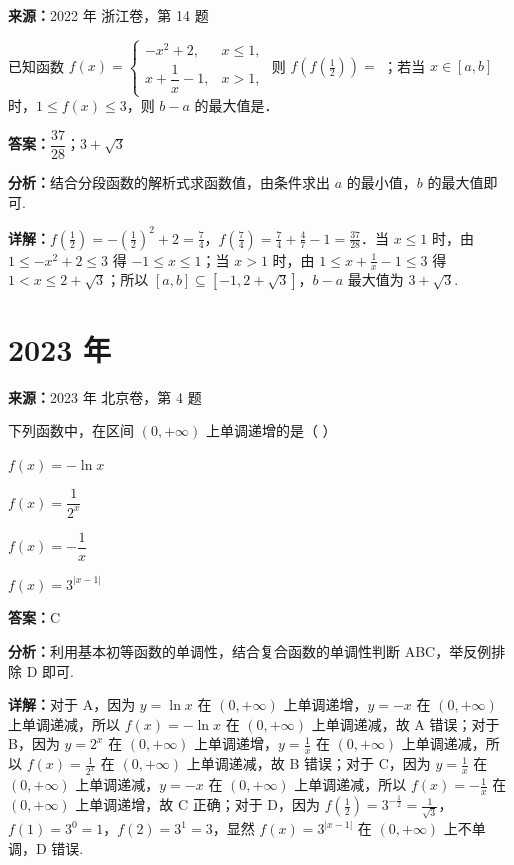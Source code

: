 \begin{question}[points=6]
\textbf{来源：}2022 年 浙江卷，第 14 题\par
已知函数 $f(x) = \begin{cases} -x^2+2, & x \le 1, \\ x+\dfrac{1}{x}-1, & x > 1, \end{cases}$ 则 $f\left(f\left(\frac{1}{2}\right)\right) =$ ；若当 $x \in [a,b]$ 时，$1 \le f(x) \le 3$，则 $b-a$ 的最大值是．
\begin{solution}
\textbf{答案：}$\dfrac{37}{28}$；$3+\sqrt{3}$

\textbf{分析：}结合分段函数的解析式求函数值，由条件求出 $a$ 的最小值，$b$ 的最大值即可.

\textbf{详解：}$f(\frac{1}{2}) = -(\frac{1}{2})^2+2 = \frac{7}{4}$，$f(\frac{7}{4}) = \frac{7}{4}+\frac{4}{7}-1 = \frac{37}{28}$．当 $x\le1$ 时，由 $1\le -x^2+2 \le 3$ 得 $-1\le x\le1$；当 $x>1$ 时，由 $1\le x+\frac{1}{x}-1\le 3$ 得 $1<x\le 2+\sqrt{3}$；所以 $[a,b]\subseteq[-1,2+\sqrt{3}]$，$b-a$ 最大值为 $3+\sqrt{3}$.
\end{solution}
\end{question}

\section*{2023 年}

\begin{question}[points=4]
\textbf{来源：}2023 年 北京卷，第 4 题\par
下列函数中，在区间 $(0, +\infty)$ 上单调递增的是（ ）
\begin{choices}
  \item $f(x) = -\ln x$
  \item $f(x) = \dfrac{1}{2^x}$
  \item $f(x) = -\dfrac{1}{x}$
  \item $f(x) = 3^{|x-1|}$
\end{choices}
\begin{solution}
\textbf{答案：}C

\textbf{分析：}利用基本初等函数的单调性，结合复合函数的单调性判断 ABC，举反例排除 D 即可.

\textbf{详解：}对于 A，因为 $y=\ln x$ 在 $(0,+\infty)$ 上单调递增，$y=-x$ 在 $(0,+\infty)$ 上单调递减，所以 $f(x)=-\ln x$ 在 $(0,+\infty)$ 上单调递减，故 A 错误；对于 B，因为 $y=2^x$ 在 $(0,+\infty)$ 上单调递增，$y=\frac{1}{x}$ 在 $(0,+\infty)$ 上单调递减，所以 $f(x)=\frac{1}{2^x}$ 在 $(0,+\infty)$ 上单调递减，故 B 错误；对于 C，因为 $y=\frac{1}{x}$ 在 $(0,+\infty)$ 上单调递减，$y=-x$ 在 $(0,+\infty)$ 上单调递减，所以 $f(x)=-\frac{1}{x}$ 在 $(0,+\infty)$ 上单调递增，故 C 正确；对于 D，因为 $f(\frac{1}{2})=3^{-\frac{1}{2}}=\frac{1}{\sqrt{3}}$，$f(1)=3^0=1$，$f(2)=3^1=3$，显然 $f(x)=3^{|x-1|}$ 在 $(0,+\infty)$ 上不单调，D 错误.
\end{solution}
\end{question}

